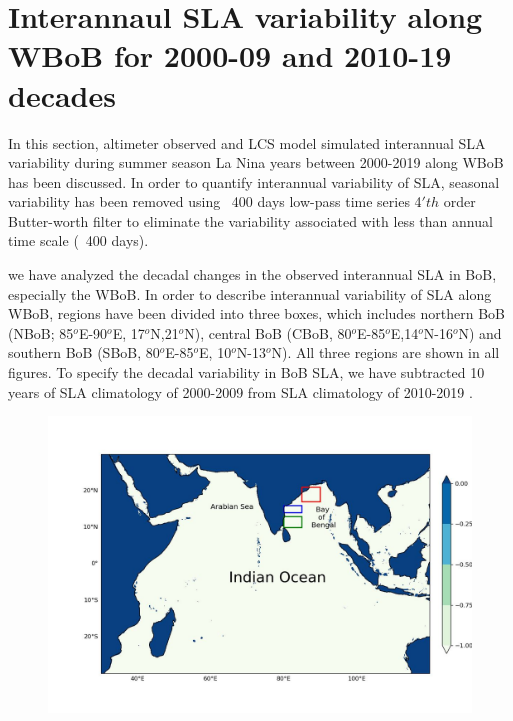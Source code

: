 \documentclass[review]{elsarticle}
\begin{document}
\section{Interannaul SLA variability along WBoB for 2000-09 and 2010-19 decades}
In this section, altimeter observed and LCS model simulated interannual SLA variability during summer season La Nina years between 2000-2019 along WBoB has been discussed. In order to quantify interannual variability of SLA, seasonal variability has been removed using ~400 days low-pass time series 4$'th$ order Butter-worth filter to eliminate the variability associated with less than annual time scale (~400 days).

we have analyzed the decadal changes in the observed interannual SLA in BoB, especially the WBoB. In order to describe interannual variability of SLA along WBoB, regions have been divided into three boxes, which includes northern BoB (NBoB; 85$^o$E-90$^o$E, 17$^o$N,21$^o$N), central BoB (CBoB, 80$^o$E-85$^o$E,14$^o$N-16$^o$N) and southern BoB (SBoB, 80$^o$E-85$^o$E, 10$^o$N-13$^o$N). All three regions are shown in all figures. To specify the decadal variability in BoB SLA, we have subtracted 10 years of SLA climatology of 2000-2009 from SLA climatology of 2010-2019 .



\clearpage
\begin{figure}[!t]
\centering
\includegraphics[scale=0.5]{images/domain_fig.jpg}
\caption{}
\label{fig}
\end{figure}
\end{document}
